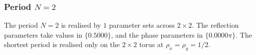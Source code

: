 \par
\subsubsection{Period $N = 2$}
The period $N=2$ is realised by $1$ parameter sets across $2\times2$. The reflection parameters take values in $\{0.5000\}$, and the phase parameters in $\{0.0000\pi\}$. The shortest period is realised only on the $2 \times 2$
torus at $\rho_x = \rho_y = 1/2$.
